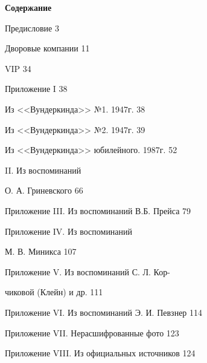 \documentclass[utf8x, 12pt, twoside, a5paper]{G7-32} %
\begin{document}
\begin{center}

    \textbf{\Large Содержание}

    \indent

    Предисловие \hfill 3
    
    Дворовые компании \hfill 11
    
    VIP \hfill 34
    
    Приложение I \hfill 38
    
    \hspace{20pt} Из <<Вундеркинда>> №1. 1947г. \hfill 38
    
    \hspace{20pt} Из <<Вундеркинда>> №2. 1947г. \hfill 39
    
    \hspace{20pt} Из <<Вундеркинда>> юбилейного. 1987г. \hfill 52
    
    
    { II. Из воспоминаний 
    
    }
    
    \hspace{93pt}О. А. Гриневского \hfill 66
    
    Приложение III. Из воспоминаний В.Б. Прейса \hfill 79

    {\raggedright Приложение IV. Из воспоминаний
    
    } 
    \hspace{93pt}М. В. Миникса \hfill 107
   
    {\raggedright Приложение V. Из воспоминаний С. Л. Кор-
    
    }
    
    \hspace{93pt}чиковой (Клейн) и др. \hfill 111
    
    Приложение VI. Из воспоминаний Э. И. Певзнер \hfill 114
    
    Приложение VII. Нерасшифрованные фото \hfill 123    
    
    Приложение VIII. Из официальных источников \hfill 124
    
    
    
\end{center}
\end{document}
